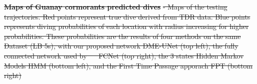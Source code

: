 \documentclass{article}
\providecommand{\DIFdeltex}[1]{{\protect\color{red}\sout{#1}}}                      %
\providecommand{\DIFdelbegin}{} %
\providecommand{\DIFdelFL}[1]{\DIFdel{#1}} %
\providecommand{\DIFdel}[1]{\texorpdfstring{\DIFdeltex{#1}}{}} %
\newcommand{\DIFscaledelfig}{0.5}
\newlength{\DIFdelgraphicswidth} %
\newlength{\DIFdelgraphicsheight} %
\newcommand{\DIFdelincludegraphics}[2][]{%
\sbox{\DIFdelgraphicsbox}{\DIFOincludegraphics[#1]{#2}}%
\settoboxwidth{\DIFdelgraphicswidth}{\DIFdelgraphicsbox} %
\settoboxtotalheight{\DIFdelgraphicsheight}{\DIFdelgraphicsbox} %
\scalebox{\DIFscaledelfig}{%
\parbox[b]{\DIFdelgraphicswidth}{\usebox{\DIFdelgraphicsbox}\\[-\baselineskip] \rule{\DIFdelgraphicswidth}{0em}}\llap{\resizebox{\DIFdelgraphicswidth}{\DIFdelgraphicsheight}{%
\setlength{\unitlength}{\DIFdelgraphicswidth}%
\begin{picture}(1,1)%
\thicklines\linethickness{2pt} %
{\color[rgb]{1,0,0}\put(0,0){\framebox(1,1){}}}%
{\color[rgb]{1,0,0}\put(0,0){\line( 1,1){1}}}%
{\color[rgb]{1,0,0}\put(0,1){\line(1,-1){1}}}%
\end{picture}%
}\hspace*{3pt}}} %
} %
\DeclareRobustCommand{\DIFdelbegin}{\DIFOdelbegin \let\includegraphics\DIFdelincludegraphics} %
\begin{document}
\DIFdelbegin %
{%
\textbf{\DIFdelFL{Maps of Guanay cormorants predicted dives}} %
\DIFdelFL{- Maps of the testing trajectories. Red points represent true dive derived from TDR data. Blue points represents diving probabilities of each location with radius increasing for higher probabilities. These probabilities are the results of four methods on the same Dataset (LB 5s), with our proposed network DME-UNet (top left), the fully connected network used by \mbox{%
\cite{browning_predicting_2018}  }\hspace{0pt}%
FCNet (top right), the 3 states Hidden Markov Models HMM (bottom left), and the First Time Passage apporach FPT (bottom right)}}


\end{document}
